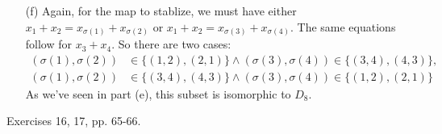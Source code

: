 \documentclass[12pt]{article}
\theoremstyle{remark}
\theoremstyle{named}
\begin{document}
\begin{enumerate}
\begin{enumerate}
        \item[(f)] Again, for the map to stablize, we must have either \(x_1 + x_2 = x_{\sigma(1)} + x_{\sigma(2)}\) or \(x_1 + x_2 = x_{\sigma(3)} + x_{\sigma(4)}\). The same equations follow for \(x_3 + x_4\). So there are two cases:
        \begin{align*}
            (\sigma(1), \sigma(2)) &\in \{(1, 2), (2, 1)\} \land (\sigma(3), \sigma(4)) \in \{(3, 4), (4, 3)\}, \\
            (\sigma(1), \sigma(2)) &\in \{(3, 4), (4, 3)\} \land (\sigma(3), \sigma(4)) \in \{(1, 2), (2, 1)\}
        \end{align*}
        As we've seen in part (e), this subset is isomorphic to \(D_8\).
    \end{enumerate}
\end{enumerate}

Exercises 16, 17, pp. 65-66.
\end{document}

